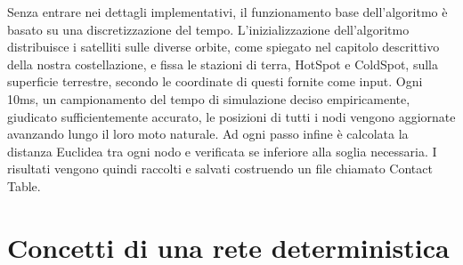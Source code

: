 \documentclass[12pt,a4paper,oneside]{book}
\begin{document}
		Senza entrare nei dettagli implementativi, il funzionamento base dell'algoritmo è basato su una discretizzazione del tempo. L'inizializzazione dell'algoritmo distribuisce i satelliti sulle diverse orbite, come spiegato nel capitolo descrittivo della nostra costellazione, e fissa le stazioni di terra, HotSpot e ColdSpot, sulla superficie terrestre, secondo le coordinate di questi fornite come input. Ogni 10ms, un campionamento del tempo di simulazione deciso empiricamente, giudicato sufficientemente accurato, le posizioni di tutti i nodi vengono aggiornate avanzando lungo il loro moto naturale. Ad ogni passo infine è calcolata la distanza Euclidea tra ogni nodo e verificata se inferiore alla soglia necessaria. I risultati vengono quindi raccolti e salvati costruendo un file chiamato Contact Table.
		
		
		
		

		\section{Concetti di una rete deterministica}
\end{document}
